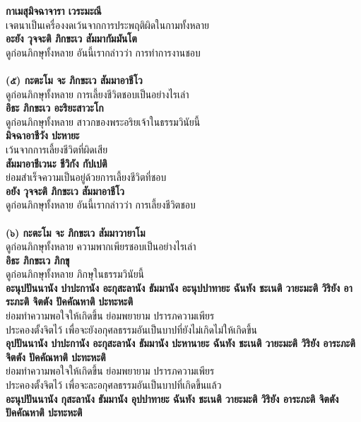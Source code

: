 \documentclass[12pt]{article}
\begin{document}
\textbf{กาเมสุมิจฉาจารา เวระมะณี}\\
\indent เจตนาเป็นเครื่องงดเว้นจากการประพฤติผิดในกามทั้งหลาย\\
\textbf{อะยัง วุจจะติ ภิกขะเว สัมมากัมมันโต}\\
\indent ดูก่อนภิกษุทั้งหลาย อันนี้เรากล่าวว่า การทำการงานชอบ\\
\\
\textbf{(๕) กะตะโม จะ ภิกขะเว สัมมาอาชีโว}\\
\indent ดูก่อนภิกษุทั้งหลาย การเลี้ยงชีวิตชอบเป็นอย่างไรเล่า\\
\textbf{อิธะ ภิกขะเว อะริยะสาวะโก}\\
\indent ดูก่อนภิกษุทั้งหลาย สาวกของพระอริยเจ้าในธรรมวินัยนี้\\
\textbf{มิจฉาอาชีวัง ปะหายะ}\\
\indent เว้นจากการเลี้ยงชีวิตที่ผิดเสีย\\
\textbf{สัมมาอาชีเวนะ ชีวิกัง กัปเปติ}\\
\indent ย่อมสำเร็จความเป็นอยู่ด้วยการเลี้ยงชีวิตที่ชอบ\\
\textbf{อยัง วุจจะติ ภิกขะเว สัมมาอาชีโว}\\
\indent ดูก่อนภิกษุทั้งหลาย อันนี้เรากล่าวว่า การเลี้ยงชีวิตชอบ\\
\\
\textbf{(๖) กะตะโม จะ ภิกขะเว สัมมาวายาโม}\\
\indent ดูก่อนภิกษุทั้งหลาย ความพากเพียรชอบเป็นอย่างไรเล่า\\
\textbf{อิธะ ภิกขะเว ภิกขุ}\\
\indent ดูก่อนภิกษุทั้งหลาย ภิกษุในธรรมวินัยนี้\\
\textbf{อะนุปปันนานัง ปาปะกานัง  อะกุสะลานัง ธัมมานัง อะนุปปาทายะ 
ฉันทัง ชะเนติ วายะมะติ วิริยัง อาระภะติ จิตตัง ปัคคัณหาติ ปะทะหะติ}\\
\indent ย่อมทำความพอใจให้เกิดขึ้น ย่อมพยายาม ปรารภความเพียร \\
\indent ประคองตั้งจิตไว้ เพื่อจะยังอกุศลธรรมอันเป็นบาปที่ยังไม่เกิดไม่ให้เกิดขึ้น\\
\textbf{อุปปันนานัง ปาปะกานัง อะกุสะลานัง ธัมมานัง ปะหานายะ 
ฉันทัง ชะเนติ วายะมะติ วิริยัง อาระภะติ จิตตัง ปัคคัณหาติ ปะทะหะติ}\\
\indent ย่อมทำความพอใจให้เกิดขึ้น ย่อมพยายาม ปรารภความเพียร \\
\indent ประคองตั้งจิตไว้ เพื่อจะละอกุศลธรรมอันเป็นบาปที่เกิดขึ้นแล้ว\\
\textbf{อะนุปปันนานัง กุสะลานัง ธัมมานัง อุปปาทายะ 
ฉันทัง ชะเนติ วายะมะติ วิริยัง อาระภะติ จิตตัง ปัคคัณหาติ ปะทะหะติ}\\
\end{document}
